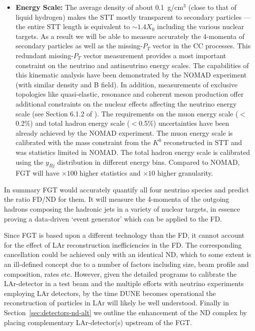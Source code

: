 \begin{itemize}
    \item {\bf Energy Scale:} The average density of about 0.1~g/cm$^3$ (close to that of liquid hydrogen) 
    makes the STT mostly transparent to secondary particles --- the entire STT length is equivalent to 
    $\sim 1.4 X_0$ including the various nuclear targets. As a result we will be able to measure accurately 
    the 4-momenta of secondary particles as well as the missing-$P_T$ vector in the CC processes. 
    This redundant missing-$P_T$ vector measurement provides a most important constraint 
    on the neutrino and antineutrino energy scales. The capabilities of this kinematic analysis have been 
    demonstrated by the NOMAD experiment (with similar density and B field). 
    In addition, measurements of exclusive topologies like quasi-elastic, resonance and coherent meson production  
    offer additional constraints on the nuclear effects affecting the neutrino energy scale 
    (see Section 6.1.2 of \volphys).  %
    The requirements on the muon energy scale ($<$0.2\%) and total hadron 
    energy scale ($<$0.5\%) uncertainties have been already achieved by the NOMAD experiment. The muon energy 
    scale is calibrated with the mass constraint from the $K^0$ reconstructed in STT and was statistics limited 
    in NOMAD. The total hadron energy scale is calibrated using the $y_{Bj}$ distribution in different 
    energy bins. Compared to NOMAD, FGT will have $\times 100$ higher statistics and $\times 10$ higher 
    granularity.  
\end{itemize}

In summary FGT would accurately quantify all four neutrino species and predict the ratio FD/ND for them. 
It will measure the 4-momenta of the outgoing hadrons composing the hadronic jets in a variety of 
nuclear targets, in essence proving a data-driven `event generator' which can be applied to the FD. 

Since FGT is based upon a different technology than the FD, it cannot account for 
the effect of LAr reconstruction inefficiencies in the FD. The corresponding cancellation could be achieved only 
with an identical ND, which to some extent is an ill-defined concept due to a number of factors including size, 
beam profile and composition, rates etc. However, given the detailed programs to calibrate the LAr-detector 
in a test beam and the multiple efforts with neutrino experiments employing LAr detectors, by the time DUNE 
becomes operational the reconstruction of particles in LAr will likely be well understood. Finally in 
Section~\ref{sec:detectors-nd-alt} we outline the enhancement of the ND complex by placing 
complementary LAr-detector(s) upstream of the FGT. 

